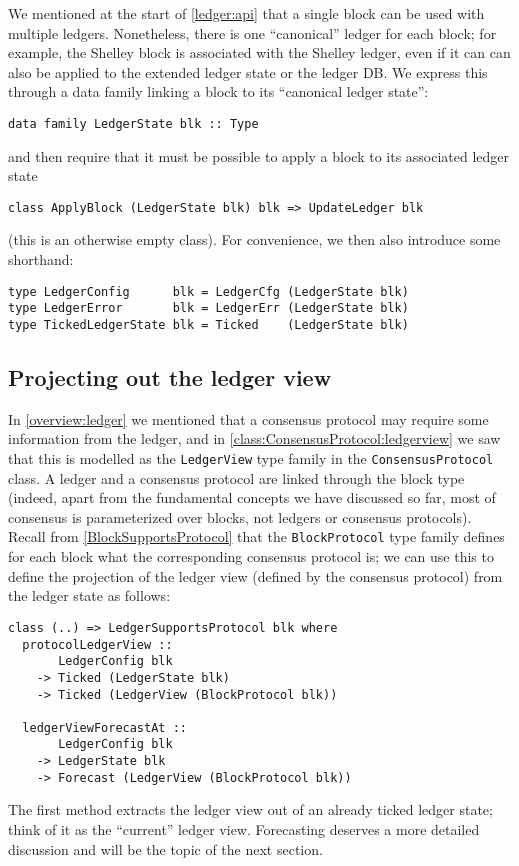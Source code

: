 We mentioned at the start of \cref{ledger:api} that a single block can be used
with multiple ledgers. Nonetheless, there is one ``canonical'' ledger for each
block; for example, the Shelley block is associated with the Shelley ledger,
even if it can can also be applied to the extended ledger state or the ledger
DB. We express this through a data family linking a block to its ``canonical
ledger state'':
%
\begin{lstlisting}
data family LedgerState blk :: Type
\end{lstlisting}
%
and then require that it must be possible to apply a block to its associated
ledger state
%
\begin{lstlisting}
class ApplyBlock (LedgerState blk) blk => UpdateLedger blk
\end{lstlisting}
%
(this is an otherwise empty class). For convenience, we then also introduce
some shorthand:
%
\begin{lstlisting}
type LedgerConfig      blk = LedgerCfg (LedgerState blk)
type LedgerError       blk = LedgerErr (LedgerState blk)
type TickedLedgerState blk = Ticked    (LedgerState blk)
\end{lstlisting}

\subsection{Projecting out the ledger view}
\label{ledger:api:LedgerSupportsProtocol}

In \cref{overview:ledger} we mentioned that a consensus protocol may require
some information from the ledger, and in
\cref{class:ConsensusProtocol:ledgerview} we saw that this is modelled as the
\lstinline!LedgerView! type family in the \lstinline!ConsensusProtocol! class. A
ledger and a consensus protocol are linked through the block type (indeed, apart
from the fundamental concepts we have discussed so far, most of consensus is
parameterized over blocks, not ledgers or consensus protocols). Recall from
\cref{BlockSupportsProtocol} that the \lstinline!BlockProtocol! type family
defines for each block what the corresponding consensus protocol is; we  can use
this to define the projection of the ledger view (defined by the consensus
protocol) from the ledger state as follows:
%
\begin{lstlisting}
class (..) => LedgerSupportsProtocol blk where
  protocolLedgerView ::
       LedgerConfig blk
    -> Ticked (LedgerState blk)
    -> Ticked (LedgerView (BlockProtocol blk))

  ledgerViewForecastAt ::
       LedgerConfig blk
    -> LedgerState blk
    -> Forecast (LedgerView (BlockProtocol blk))
\end{lstlisting}
%
The first method extracts the ledger view out of an already ticked ledger state;
think of it as the ``current'' ledger view. Forecasting deserves a more detailed
discussion and will be the topic of the next section.

